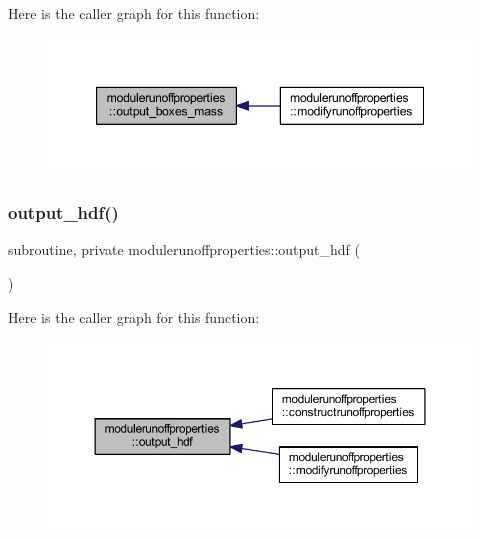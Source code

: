 Here is the caller graph for this function\+:\nopagebreak
\begin{figure}[H]
\begin{center}
\leavevmode
\includegraphics[width=347pt]{namespacemodulerunoffproperties_ad59aaacda5f23a659f2d8cf4d4c29dfa_icgraph}
\end{center}
\end{figure}
\mbox{\label{namespacemodulerunoffproperties_a7e5f01410c6d0dcb0205da11531d61d7}} 
\subsubsection{\texorpdfstring{output\+\_\+hdf()}{output\_hdf()}}
{\footnotesize\ttfamily subroutine, private modulerunoffproperties\+::output\+\_\+hdf (\begin{DoxyParamCaption}{ }\end{DoxyParamCaption})\hspace{0.3cm}{\ttfamily [private]}}

Here is the caller graph for this function\+:\nopagebreak
\begin{figure}[H]
\begin{center}
\leavevmode
\includegraphics[width=350pt]{namespacemodulerunoffproperties_a7e5f01410c6d0dcb0205da11531d61d7_icgraph}
\end{center}
\end{figure}
\mbox{\label{namespacemodulerunoffproperties_aab6832deb9eca45c9392ee3c49085c37}} 
